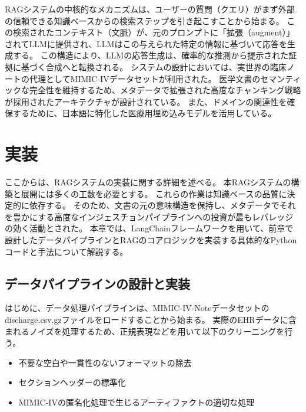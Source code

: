 \documentclass[12pt,a4paper]{jsarticle}
\begin{document}
RAGシステムの中核的なメカニズムは、ユーザーの質問（クエリ）がまず外部の信頼できる知識ベースからの検索ステップを引き起こすことから始まる。
この検索されたコンテキスト（文脈）が、元のプロンプトに「拡張（augment）」されてLLMに提供され、LLMはこの与えられた特定の情報に基づいて応答を生成する。
この構造により、LLMの応答生成は、確率的な推測から提示された証拠に基づく合成へと転換される。
システムの設計においては、実世界の臨床ノートの代理としてMIMIC-IVデータセットが利用された。
医学文書のセマンティックな完全性を維持するため、メタデータで拡張された高度なチャンキング戦略が採用されたアーキテクチャが設計されている。
また、ドメインの関連性を確保するために、日本語に特化した医療用埋め込みモデルを活用している。

\section{実装}
\label{sec:ex4}

ここからは、RAGシステムの実装に関する詳細を述べる。
本RAGシステムの構築と展開には多くの工数を必要とする。
これらの作業は知識ベースの品質に決定的に依存する。
そのため、文書の元の意味構造を保持し、メタデータでそれを豊かにする高度なインジェスチョンパイプラインへの投資が最もレバレッジの効く活動とされた。
本章では、LangChainフレームワークを用いて、前章で設計したデータパイプラインとRAGのコアロジックを実装する具体的なPythonコードと手法について解説する。

\subsection{データパイプラインの設計と実装}
はじめに、データ処理パイプラインは、MIMIC-IV-Noteデータセットのdischarge.csv.gzファイルをロードすることから始まる。
実際のEHRデータに含まれるノイズを処理するため、正規表現などを用いて以下のクリーニングを行う。
\begin{itemize}
	\item 不要な空白や一貫性のないフォーマットの除去
	\item セクションヘッダーの標準化
	\item MIMIC-IVの匿名化処理で生じるアーティファクトの適切な処理
\end{itemize}
\end{document}
